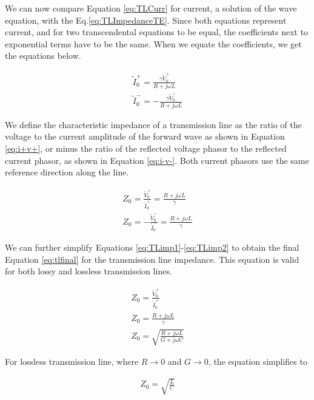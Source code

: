 \documentclass{ximera}
\begin{document}
We can now compare Equation \ref{eq:TLCurr} for current, a solution of the wave equation,  with the Eq.\ref{eq:TLImpedanceTE}. Since both equations represent current, and for two transcendental equations to be equal, the coefficients next to exponential terms have to be the same. When we equate the coefficients, we get the equations below.

\begin{eqnarray}
\tilde{I}_0^+=\frac{\gamma \tilde{V}_0^+}{R+ j \omega L} \label{eq:i+v+}  \\
\tilde{I}_0^-= - \frac{\gamma \tilde{V}_0^-}{R+ j \omega L} \label{eq:i-v-}
\end{eqnarray}


\begin{definition}
We define the characteristic impedance of a transmission line  as
the ratio of the voltage to the current amplitude of the forward
wave as shown in Equation \ref{eq:i+v+}, or minus the ratio of the
reflected voltage phasor to the reflected current phasor, as shown
in Equation \ref{eq:i-v-}. Both current phasors use the same
reference direction along the line.

\begin{eqnarray}
Z_0=\frac{\tilde{V}_0^+}{ \tilde{I}_0^+}=\frac{R+j\omega L}{\gamma} \label{eq:TLimp1}\\
Z_0=-\frac{\tilde{V}_0^-}{ \tilde{I}_0^-}=\frac{R+j\omega L}{\gamma}  \label{eq:TLimp2}
\end{eqnarray}


\end{definition}
We can further simplify Equations \ref{eq:TLimp1}-\ref{eq:TLimp2} to obtain the final Equation \ref{eq:tlfinal} for the transmission line impedance. This equation is valid for both lossy and lossless transmission lines.

\begin{eqnarray}
Z_0=\frac{\tilde{V}_0^+}{ \tilde{I}_0^+} \nonumber   \\ \nonumber
Z_0=\frac{R+j\omega L}{\gamma} \nonumber   \\ \nonumber
Z_0=\sqrt{\frac{R+j\omega L}{G+ j\omega C}} \label{eq:tlfinal}
\end{eqnarray}

For lossless transmission line, where $R \rightarrow 0$ and  $G \rightarrow 0$, the equation simplifies to 

\begin{eqnarray}
Z_0=\sqrt{\frac{L}{C}} 
\end{eqnarray}
\end{document}
